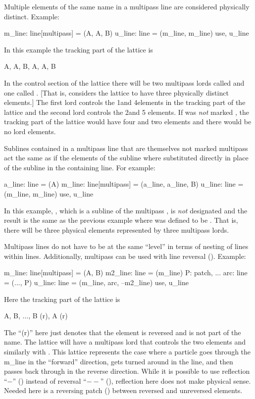 Multiple elements of the same name in a multipass line are considered 
physically distinct. Example:
\begin{example}
  m_line: line[multipass] = (A, A, B)
  u_line: line = (m_line, m_line)
  use, u_line
\end{example}
In this example the tracking part of the lattice is
\begin{example}
  A, A, B, A, A, B
\end{example}
In the control section of the lattice there will be two multipass
lords called  and one called . [That is, \bmad considers
the lattice to have three physically distinct elements.] The first
 lord controls the 1\St and 4\Th elements in the tracking part
of the lattice and the second  lord controls the 2\Nd and 5\Th
elements. If  was {\em not} marked , the
tracking part of the lattice would have four  and two 
elements and there would be no lord elements.

Sublines contained in a multipass line that are themselves not marked multipass act the same as if
the elements of the subline where substituted directly in place of the subline in the containing
line. For example:
\begin{example}
  a_line: line = (A)
  m_line: line[multipass] = (a_line, a_line, B)
  u_line: line = (m_line, m_line)
  use, u_line
\end{example}
In this example, , which is a subline of the multipass
, is {\em not} designated  and the result
is the same as the previous example where  was defined
to be . That is, there will be three physical elements
represented by three multipass lords.

Multipass lines do not have to be at the same ``level'' in terms of nesting of lines within
lines. Additionally, multipass can be used with line reversal (). Example:
\begin{example}
  m_line: line[multipass] = (A, B)
  m2_line: line = (m_line)
  P: patch, ...
  arc: line = (..., P)
  u_line: line = (m_line, arc, --m2_line)
  use, u_line
\end{example}
Here the tracking part of the lattice is
\begin{example}
  A, B, ..., B (r), A (r)
\end{example}
The ``(r)'' here just denotes that the element is reversed and is not part of the name. The lattice
will have a multipass lord  that controls the two  elements and similarly with
. This lattice represents the case where a particle goes through the m_line in the ``forward''
direction, gets turned around in the  line, and then passes back through  in the
reverse direction.  While it is possible to use reflection ``$-$'' () instead
of reversal ``$--$'' (), reflection here does not make physical sense.  Needed
here is a reversing patch  () between reversed and unreversed elements.


